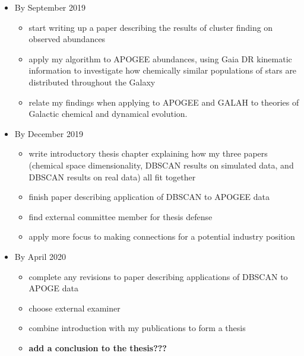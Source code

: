 \documentclass[11pt]{article}
\begin{document}
\begin{itemize}
\item By September 2019
\begin{itemize}
\item {\color{RoyalBlue} start writing up a paper describing the results of cluster finding on observed abundances}
\item {\color{RoyalBlue} apply my algorithm to APOGEE abundances, using Gaia DR kinematic information to investigate how chemically similar populations of stars are distributed throughout the Galaxy}
\item {\color{ForestGreen} relate my findings when applying to APOGEE and GALAH to theories of Galactic chemical and dynamical evolution.}
\end{itemize}
\item By December 2019
\begin{itemize}
\item write introductory thesis chapter explaining how my three papers (chemical space dimensionality, DBSCAN results on simulated data, and DBSCAN results on real data) all fit together
\item {finish paper describing application of DBSCAN to APOGEE data}
\item find external committee member for thesis defense
\item {\color{ForestGreen} apply more focus to making connections for a potential industry position}
\end{itemize}
\item By April 2020
\begin{itemize}
\item complete any revisions to paper describing applications of DBSCAN to APOGE data
\item choose external examiner
\item combine introduction with my publications to form a thesis
\item \textbf{add a conclusion to the thesis???}
\end{itemize}
\end{itemize}
\end{document}
